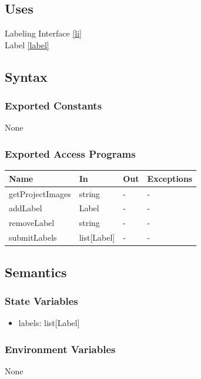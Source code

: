 \documentclass[12pt, titlepage]{article}
\begin{document}
\subsection{Uses}

Labeling Interface \ref{li}\\
Label \ref{label} \\

\subsection{Syntax}

\subsubsection{Exported Constants}
None
\subsubsection{Exported Access Programs}

\begin{center}
\begin{tabular}{p{4cm} p{4cm} p{4cm} p{2cm}}
\hline
\textbf{Name} & \textbf{In} & \textbf{Out} & \textbf{Exceptions} \\
\hline
getProjectImages & string & - & - \\
addLabel & Label & - & - \\
removeLabel & string & - & - \\
submitLabels & list[Label] & - & - \\
\hline
\end{tabular}
\end{center}

\subsection{Semantics}

\subsubsection{State Variables}
\begin{itemize}
    \item labels: list[Label]
\end{itemize}

\subsubsection{Environment Variables}
None
\end{document}
